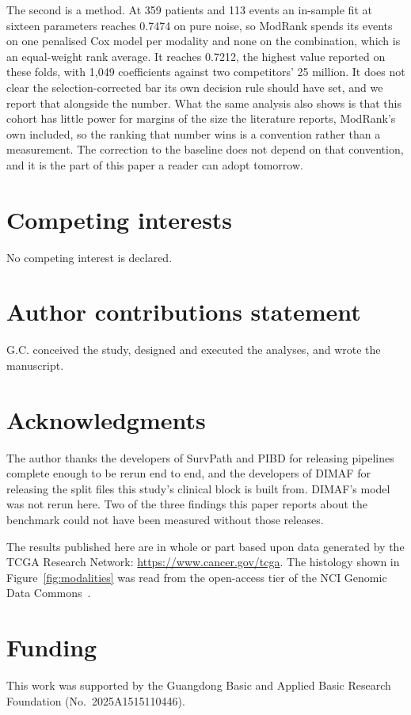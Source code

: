 \documentclass[unnumsec,webpdf,contemporary,large]{oup-authoring-template}
\begin{document}
The second is a method. At 359 patients and 113 events an in-sample fit at sixteen parameters
reaches 0.7474 on pure noise, so ModRank spends its events on one penalised Cox model per modality
and none on the combination, which is an equal-weight rank average. It reaches 0.7212, the highest value reported on these folds, with 1,049 coefficients against two competitors' 25 million. It does not clear the selection-corrected bar its own decision rule should have set, and we report that alongside the number. What the same analysis also shows is that this cohort has little power for
margins of the size the literature reports, ModRank's own included, so the ranking that number wins
is a convention rather than a measurement. The correction to the baseline does not depend on that
convention, and it is the part of this paper a reader can adopt tomorrow.

\section{Competing interests}
No competing interest is declared.

\section{Author contributions statement}
G.C. conceived the study, designed and executed the analyses, and wrote the manuscript.

\section{Acknowledgments}
The author thanks the developers of SurvPath and PIBD for releasing pipelines complete enough to
be rerun end to end, and the developers of DIMAF for releasing the split files this study's
clinical block is built from. DIMAF's model was not rerun here. Two of the three findings this
paper reports about the benchmark could not have been measured without those releases.

The results published here are in whole or part based upon data generated by the TCGA Research
Network: \url{https://www.cancer.gov/tcga}. The histology shown in Figure~\ref{fig:modalities} was
read from the open-access tier of the NCI Genomic Data Commons~\citep{heath2021gdc}.

\section{Funding}
This work was supported by the Guangdong Basic and Applied Basic Research Foundation
(No.~2025A1515110446).
\end{document}
